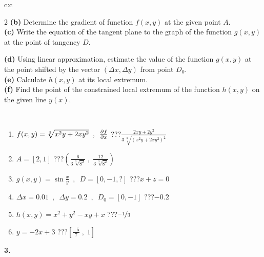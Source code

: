 \documentclass[10pt]{report}
\begin{document}
\begin{tabular}{c:c}
\begin{minipage}[c][104.5mm][t]{0.5\linewidth}
\begin{center}
\begin{minipage}{0.95\linewidth}
\begin{center}
{\begin{multicols}{2}
\textbf{(b)} Determine the gradient of function \(f(x,y)\) at the given point \(A\). \\[1mm]
\textbf{(c)} Write the equation of the tangent plane to the graph of the function \(g(x,y)\) at the point of tangency \(D\). \par \columnbreak
\textbf{(d)} Using linear approximation, estimate the value of the function \(g(x,y)\) at the point shifted by the vector \((\Delta x, \Delta y)\) from point \(D_0\). \\[1mm]
\textbf{(e)} Calculate \(h(x,y)\) at its local extremum. \\[1mm]
\textbf{(f)} Find the point of the constrained local extremum of the function \(h(x,y)\) on the given line \(y(x)\). \\[1mm]
\end{multicols}
}
\end{center}
\end{minipage}
\\[4mm]
\begin{minipage}{0.79\linewidth}
\begin{center}
\begin{varwidth}{\linewidth}
\begin{enumerate}
\normalsizerr
\item $f(x,y) = \sqrt[3]{x^2y + 2xy^2}\enspace , \enspace \pdv{f}{x}$\quad \dotfill\; ???\;\dotfill \quad $\frac{2xy+2y^2}{3\,\sqrt[3]{(x^2y+2xy^2)^{2}}}$
\item $A = [2, 1]$\quad \dotfill\; ???\;\dotfill \quad $\left( \frac{6}{3\,\sqrt[3]{8^2}} \;,\; \frac{12}{3\,\sqrt[3]{8^2}} \right)$
\item $g(x,y) = \sin\frac{x}{y} \enspace , \enspace D = [0, -1, ?]$\quad \dotfill\; ???\;\dotfill \quad $x+z=0$
\item $\Delta x = {0.01} \enspace,\enspace \Delta y = {0.2} \enspace,\enspace D_0 = [0,-1]$\quad \dotfill\; ???\;\dotfill \quad $-0.2$
\item $h(x,y) = x^2+y^2-xy+x$\quad \dotfill\; ???\;\dotfill \quad $\nicefrac{-1}{3}$
\item $y = -2x+3$\quad \dotfill\; ???\;\dotfill \quad $\left[\frac{-5}{7}\;,\;1\right]$
\end{enumerate}
\end{varwidth}
\end{center}
\end{minipage}
\begin{minipage}{0.20\linewidth}
\begin{center}
{\Huge\bfseries 3.} \\[2mm]

\end{center}
\end{minipage}
\end{center}
\end{minipage}
\end{tabular}
\end{document}
